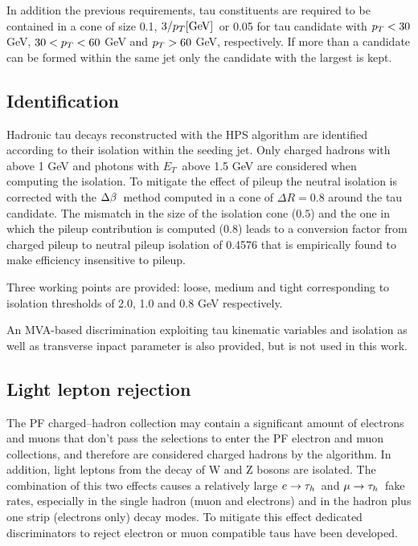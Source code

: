 In addition the previous requirements, tau constituents are required to be contained in a cone of size 0.1, $3 / p_{T} \mathrm{[GeV]}$\ or 0.05 for tau candidate with $p_{T} < 30$ GeV, $30 < p_{T} < 60$ GeV and $p_{T} > 60$ GeV, respectively. If more than a candidate can be formed within the same jet only the candidate with the largest \pT is kept.

\subsection{Identification}

Hadronic tau decays reconstructed with the HPS algorithm are identified according to their isolation within the seeding jet. Only charged hadrons with \pT above 1 GeV and photons with $E_T$\ above 1.5 GeV are considered when computing the isolation. To mitigate the effect of pileup the neutral isolation is corrected with the $\Delta\beta$\ method computed in a cone of $\Delta R = 0.8$ around the tau candidate. The mismatch in the size of the isolation cone ($0.5$) and the one in which the pileup contribution is computed (0.8) leads to a conversion factor from charged pileup to neutral pileup isolation of 0.4576 that is empirically found to make efficiency insensitive to pileup.

Three working points are provided: loose, medium and tight corresponding to isolation thresholds of 2.0, 1.0 and 0.8 GeV respectively.

An MVA-based discrimination exploiting tau kinematic variables and isolation as well as transverse inpact parameter is also provided, but is not used in this work.

\subsection{Light lepton rejection}

The PF charged--hadron collection may contain a significant amount of electrons and muons that don't pass the selections to enter the PF electron and muon collections, and therefore are considered charged hadrons by the algorithm. In addition, light leptons from the decay of W and Z bosons are isolated. The combination of this two effects causes a relatively large $e\rightarrow\tau_h$\ and $\mu\rightarrow\tau_h$\ fake rates, especially in the single hadron (muon and electrons) and in the hadron plus one strip (electrons only) decay modes. To mitigate this effect dedicated discriminators to reject electron or muon compatible taus have been developed.

